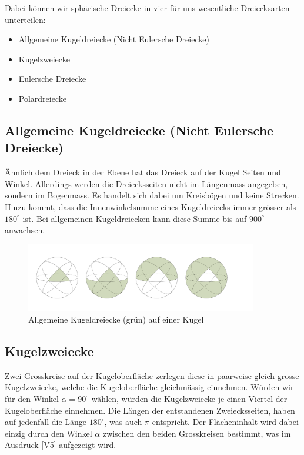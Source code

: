 \begin{refsection}
Dabei können wir sphärische Dreiecke in vier für uns wesentliche Dreiecksarten unterteilen:

\begin{itemize}
\item Allgemeine Kugeldreiecke (Nicht Eulersche Dreiecke)
\item Kugelzweiecke
\item Eulersche Dreiecke
\item Polardreiecke
\end{itemize}


\subsection{Allgemeine Kugeldreiecke (Nicht Eulersche Dreiecke)}
Ähnlich dem Dreieck in der Ebene hat das Dreieck auf der Kugel Seiten und Winkel. Allerdings werden die Dreiecksseiten nicht im Längenmass angegeben, sondern im Bogenmass. Es handelt sich dabei um Kreisbögen und keine Strecken.
Hinzu kommt, dass die Innenwinkelsumme eines Kugeldreiecks immer grösser als $180^{\circ}$ ist. Bei allgemeinen Kugeldreiecken kann diese Summe bis auf $900^{\circ}$ anwachsen.

\begin{figure}[htbp]
\centering
\includegraphics[width=0.9\textwidth]{kugel/Dreiecksarten.jpg}
\caption{Allgemeine Kugeldreiecke (grün) auf einer Kugel}
\end{figure}


\subsection{Kugelzweiecke} 
Zwei Grosskreise auf der Kugeloberfläche zerlegen diese in paarweise gleich grosse Kugelzweiecke, welche die Kugeloberfläche gleichmässig einnehmen. Würden wir für den Winkel 
$\alpha = 90^{\circ}$ wählen, würden die Kugelzweiecke je einen Viertel der Kugeloberfläche einnehmen. Die Längen der entstandenen Zweiecksseiten, haben auf jedenfall die Länge
$180^{\circ}$, was auch $\pi$ entspricht.
Der Flächeninhalt wird dabei einzig durch den Winkel $\alpha$ zwischen den beiden Grosskreisen bestimmt, was im Ausdruck \eqref{V5} aufgezeigt wird.


\end{refsection}
